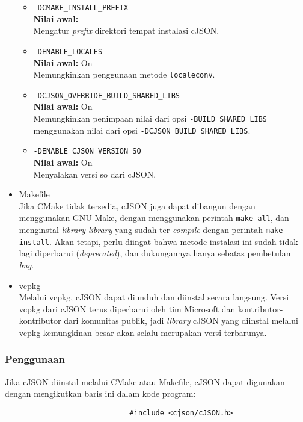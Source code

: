 \begin{itemize}[listparindent=\parindent]
\begin{itemize}
		\item \verb|-DCMAKE_INSTALL_PREFIX|\\
		\textbf{Nilai awal:} -\\
		Mengatur \textit{prefix} direktori tempat instalasi cJSON.
		\item \verb|-DENABLE_LOCALES|\\
		\textbf{Nilai awal:} On\\
		Memungkinkan penggunaan metode \verb|localeconv|.
		\item \verb|-DCJSON_OVERRIDE_BUILD_SHARED_LIBS|\\
		\textbf{Nilai awal:} On\\
		Memungkinkan penimpaan nilai dari opsi \verb|-BUILD_SHARED_LIBS| menggunakan nilai dari opsi \verb|-DCJSON_BUILD_SHARED_LIBS|.
		\item \verb|-DENABLE_CJSON_VERSION_SO|\\
		\textbf{Nilai awal:} On\\
		Menyalakan versi so dari cJSON.
	\end{itemize}

	\item Makefile\\
	Jika CMake tidak tersedia, cJSON juga dapat dibangun dengan menggunakan GNU Make, dengan menggunakan perintah \verb|make all|, dan menginstal \textit{library-library} yang sudah ter-\textit{compile} dengan perintah \verb|make install|. Akan tetapi, perlu diingat bahwa metode instalasi ini sudah tidak lagi diperbarui (\textit{deprecated}), dan dukungannya hanya sebatas pembetulan \textit{bug}.
	
	\item vcpkg\\
	Melalui vcpkg, cJSON dapat diunduh dan diinstal secara langsung. Versi vcpkg dari cJSON terus diperbarui oleh tim Microsoft dan kontributor-kontributor dari komunitas publik, jadi \textit{library} cJSON yang diinstal melalui vcpkg kemungkinan besar akan selalu merupakan versi terbarunya.
\end{itemize}

\subsubsection{Penggunaan}
\label{sec:cmodules-cJSON-usage}

Jika cJSON diinstal melalui CMake atau Makefile, cJSON dapat digunakan dengan mengikutkan baris ini dalam kode program:

\begin{verbatim}
                             #include <cjson/cJSON.h>
\end{verbatim}

